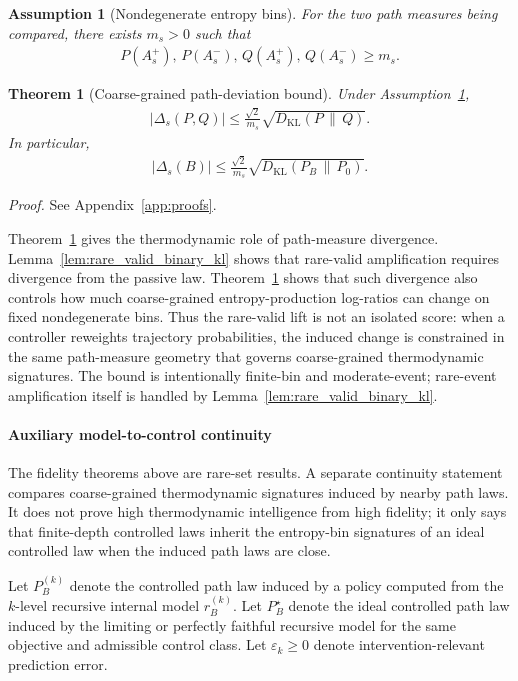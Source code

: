 \documentclass[
  aps,
  prresearch,
  reprint,
  amsmath,
  amssymb,
  superscriptaddress,
  nofootinbib,
  longbibliography
]{revtex4-2}
\def\EQSP{3pt}
\newcommand{\cgather}[2][\EQSP]{\begingroup\setlength\abovedisplayskip{#1}\setlength\belowdisplayskip{#1}\begin{gather} #2 \end{gather}\endgroup\noindent}
\newtheorem{theorem}{Theorem}
\newtheorem{assumption}{Assumption}
\newcommand{\KL}{D_{\mathrm{KL}}}
\begin{document}
\begin{assumption}[Nondegenerate entropy bins]
\label{ass:nondegenerate_bins}
For the two path measures being compared, there exists \(m_s>0\) such that
\cgather{
    P(A_s^+),\,P(A_s^-),\,Q(A_s^+),\,Q(A_s^-)
    \geq m_s.
    \label{eq:nondegenerate_bins}
}
\end{assumption}

\begin{theorem}[Coarse-grained path-deviation bound]
\label{thm:path_deviation}
Under Assumption~\ref{ass:nondegenerate_bins},
\cgather{
    |\Delta_s(P,Q)|
    \leq
    \frac{\sqrt{2}}{m_s}
    \sqrt{\KL(P\,\|\,Q)}.
    \label{eq:path_deviation_bound}
}
In particular,
\cgather{
    |\Delta_s(B)|
    \leq
    \frac{\sqrt{2}}{m_s}
    \sqrt{\KL(P_B\,\|\,P_0)}.
    \label{eq:controlled_passive_deviation_bound}
}
\end{theorem}
\noindent\emph{Proof.} See Appendix~\ref{app:proofs}.

Theorem~\ref{thm:path_deviation} gives the thermodynamic role of path-measure divergence. Lemma~\ref{lem:rare_valid_binary_kl} shows that rare-valid amplification requires divergence from the passive law. Theorem~\ref{thm:path_deviation} shows that such divergence also controls how much coarse-grained entropy-production log-ratios can change on fixed nondegenerate bins. Thus the rare-valid lift is not an isolated score: when a controller reweights trajectory probabilities, the induced change is constrained in the same path-measure geometry that governs coarse-grained thermodynamic signatures. The bound is intentionally finite-bin and moderate-event; rare-event amplification itself is handled by Lemma~\ref{lem:rare_valid_binary_kl}.

\paragraph{Auxiliary model-to-control continuity}
\label{sec:model_to_control_auxiliary}

The fidelity theorems above are rare-set results. A separate continuity statement compares coarse-grained thermodynamic signatures induced by nearby path laws. It does not prove high thermodynamic intelligence from high fidelity; it only says that finite-depth controlled laws inherit the entropy-bin signatures of an ideal controlled law when the induced path laws are close.

Let \(P_B^{(k)}\) denote the controlled path law induced by a policy computed from the \(k\)-level recursive internal model \(r_B^{(k)}\). Let \(P_B^\star\) denote the ideal controlled path law induced by the limiting or perfectly faithful recursive model for the same objective and admissible control class. Let \(\varepsilon_k\geq0\) denote intervention-relevant prediction error.
\end{document}
